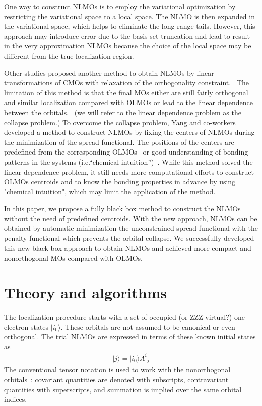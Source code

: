\documentclass[aps,prl,reprint,amsmath,amssymb]{revtex4-1}
\newcommand{\ket}[1]{\ensuremath{\vert #1 \rangle}}
\begin{document}
One way to construct NLMOs is to employ the variational optimization by restricting the variational space to a local space.
The NLMO is then expanded in the variational space, which helps to eliminate the long-range tails.
However, this approach may introduce error due to the basis set truncation and lead to result in the very approximation NLMOs because the choice of the local space may be different from the true localization region.

Other studies proposed another method to obtain NLMOs by linear transformations of CMOs with relaxation of the orthogonality constraint.~\cite{feng2004An_efficient, cui2010efficient} 
The limitation of this method is that the final MOs either are still fairly orthogonal and similar localization compared with OLMOs or lead to the linear dependence between the orbitals.~\cite{feng2004An_efficient} (we will refer to the linear dependence problem as the collapse problem.)
To overcome the collapse problem, Yang and co-workers~\cite{feng2004An_efficient, cui2010efficient}  developed a method to construct NLMOs by fixing the centers of NLMOs during the minimization of the spread functional. 
The positions of the centers are predefined from the corresponding OLMOs~\cite{feng2004An_efficient} or good understanding of bonding patterns in the systems (i.e.``chemical intuition'')~\cite{cui2010efficient}.
While this method solved the linear dependence problem, it still needs more computational efforts to construct OLMOs centroids and to know the bonding properties in advance by using "chemical intuition", which may limit the application of the method.

In this paper, we propose a fully black box method to construct the NLMOs without the need of predefined centroids.
With the new approach, NLMOs can be obtained by automatic minimization the unconstrained spread functional with the  penalty functional which prevents the orbital collapse.
We successfully developed this new black-box approach to obtain NLMOs and achieved more compact and nonorthogonal MOs compared with OLMOs.

\section{Theory and algorithms}

The localization procedure starts with a set of occupied (or ZZZ virtual?) one-electron states $\ket{i_0}$. These orbitals are not assumed to be canonical or even orthogonal. The trial NLMOs are expressed in terms of these known initial states as
%
\begin{equation}
\begin{split}
\ket{j} = \ket{i_0} {A^i}_j  
\end{split}
\end{equation}
%
The conventional tensor notation is used to work with the nonorthogonal orbitals~\cite{head1998tensor}: covariant quantities are denoted with subscripts, contravariant quantities with superscripts, and summation is implied over the same orbital indices.
\end{document}
